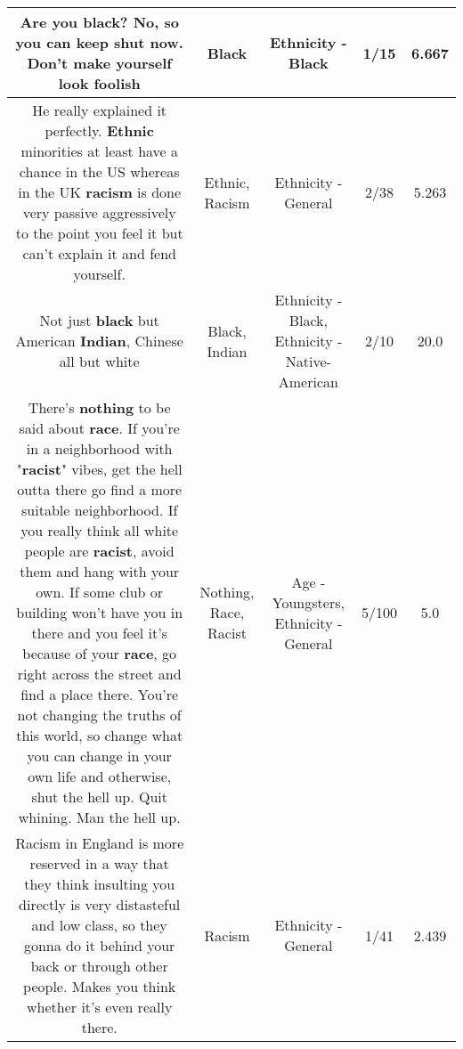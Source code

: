 \documentclass[11pt]{article}
\newlength\mylength
\begin{document}
\begin{center}
\begin{longtable}{|C{.65\mylength}|C{.30\mylength}|C{.12\mylength}|C{.12\mylength}|C{.12\mylength}|}
  \small Are you \textbf{black}? No, so you can keep shut now. Don't make yourself look foolish\normalsize   & Black & Ethnicity - Black & 1/15 & 6.667 \\  \hline
  \small He really explained it perfectly. \textbf{Ethnic} minorities at least have a chance in the US whereas in the UK \textbf{racism} is done very passive aggressively to the point you feel it but can't explain it and fend yourself.\normalsize   & Ethnic, Racism & Ethnicity - General & 2/38 & 5.263 \\  \hline
  \small Not just \textbf{black} but American \textbf{Indian}, Chinese  all but white\normalsize   & Black, Indian & Ethnicity - Black, Ethnicity - Native-American & 2/10 & 20.0 \\  \hline
  \small There's \textbf{nothing} to be said about \textbf{race}. If you're in a neighborhood with "\textbf{racist}" vibes, get the hell outta there go find a more suitable neighborhood. If you really think all white people are \textbf{racist}, avoid them and hang with your own. If some club or building won't have you in there and you feel it's because of your \textbf{race}, go right across the street and find a place there. You're not changing the truths of this world, so change what you can change in your own life and otherwise, shut the hell up. Quit whining. Man the hell up.\normalsize   & Nothing, Race, Racist & Age - Youngsters, Ethnicity - General & 5/100 & 5.0 \\  \hline
  \small Racism in England is more reserved in a way that they think insulting you directly is very distasteful and low class, so they gonna do it behind your back or through other people. Makes you think whether it's even really there.\normalsize   & Racism & Ethnicity - General & 1/41 & 2.439 \\  \hline

\end{longtable}
\end{center}
\end{document}

